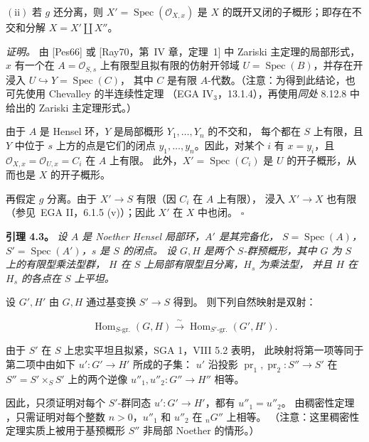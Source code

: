 \smallskip
\noindent
\(\mathrm{(ii)}\) 若 \(g\) 还分离，则 \(X'=\operatorname{Spec}(\mathcal O_{X,x})\)
是 \(X\) 的既开又闭的子概形；即存在不交和分解 \(X=X'\amalg X''\)。
\par\endgroup

\par\smallskip\noindent
\emph{证明。}
由 [Pes66] 或 [Ray70，第~IV 章，定理~1] 中 Zariski 主定理的局部形式，
\(x\) 有一个在 \(A=\mathcal O_{S,s}\) 上有限型且拟有限的仿射开邻域
\(U=\operatorname{Spec}(B)\)，并存在开浸入 \(U\hookrightarrow Y=\operatorname{Spec}(C)\)，
其中 \(C\) 是有限 \(A\)-代数。（注意：为得到此结论，也可先使用 Chevalley 的半连续性定理
（EGA IV\(_3\)，13.1.4），再使用\emph{同处} 8.12.8 中给出的 Zariski 主定理形式。）

由于 \(A\) 是 Hensel 环，\(Y\) 是局部概形 \(Y_1,\ldots,Y_n\) 的不交和，
每个都在 \(S\) 上有限，且 \(Y\) 中位于 \(s\) 上方的点是它们的闭点
\(y_1,\ldots,y_n\)。因此，对某个 \(i\) 有 \(x=y_i\)，且
\(\mathcal O_{X,x}=\mathcal O_{U,x}=C_i\) 在 \(A\) 上有限。
此外，\(X'=\operatorname{Spec}(C_i)\) 是 \(U\) 的开子概形，从而也是 \(X\) 的开子概形。

再假定 \(g\) 分离。由于 \(X'\to S\) 有限（因 \(C_i\) 在 \(A\) 上有限），
浸入 \(X'\to X\) 也有限（参见\ EGA II，6.1.5 (v)）；因此 \(X'\) 在 \(X\) 中也闭。
\hfill\(\square\)

\par\medskip\noindent
\textbf{引理 4.3。}\enspace
\begingroup\itshape
设 \(A\) 是 Noether Hensel 局部环，\(A'\) 是其完备化，
\(S=\operatorname{Spec}(A)\)，\(S'=\operatorname{Spec}(A')\)，\(s\) 是 \(S\) 的闭点。
设 \(G,H\) 是两个 \(S\)-群预概形，其中 \(G\) 为 \(S\) 上的有限型乘法型群，
\(H\) 在 \(S\) 上局部有限型且分离，\(H_s\) 为乘法型，
并且 \(H\) 在 \(H_s\) 的各点在 \(S\) 上平坦。

设 \(G',H'\) 由 \(G,H\) 通过基变换 \(S'\to S\) 得到。
则下列自然映射是双射：
\par\endgroup
\[
  \operatorname{Hom}_{S\text{-gr.}}(G,H)
  \xrightarrow{\ \sim\ }
  \operatorname{Hom}_{S'\text{-gr.}}(G',H').
\]

由于 \(S'\) 在 \(S\) 上忠实平坦且拟紧，SGA 1，VIII 5.2 表明，
此映射将第一项等同于第二项中由如下 \(u':G'\to H'\) 所成的子集：
\(u'\) 沿投影 \(\operatorname{pr}_1,\operatorname{pr}_2:S''\to S'\)
在 \(S''=S'\times_S S'\) 上的两个逆像 \(u''_1,u''_2:G''\to H''\) 相等。

因此，只须证明对每个 \(S'\)-群同态 \(u':G'\to H'\)，都有 \(u''_1=u''_2\)。
由稠密性定理 ，只需证明对每个整数
\(n>0\)，\(u''_1\) 和 \(u''_2\) 在 \({}_nG''\) 上相等。
（注意：这里稠密性定理实质上被用于基预概形 \(S''\) 非局部 Noether 的情形。）

